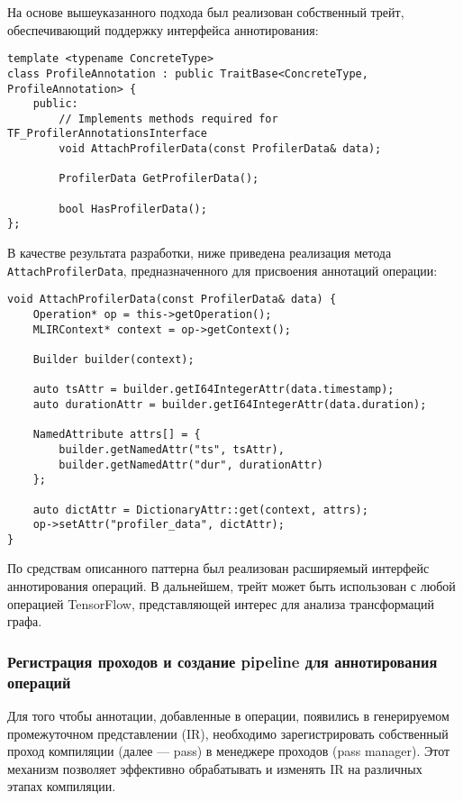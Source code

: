 На основе вышеуказанного подхода был реализован собственный трейт, обеспечивающий поддержку интерфейса аннотирования:

\begin{lstlisting}[caption={Трейт аннотирования операций MLIR}]
template <typename ConcreteType>
class ProfileAnnotation : public TraitBase<ConcreteType, ProfileAnnotation> {
    public:
        // Implements methods required for TF_ProfilerAnnotationsInterface
        void AttachProfilerData(const ProfilerData& data);

        ProfilerData GetProfilerData();

        bool HasProfilerData();
};
\end{lstlisting}

В качестве результата разработки, ниже приведена реализация метода \texttt{AttachProfilerData}, предназначенного для присвоения аннотаций операции:

\begin{lstlisting}[caption={Реализация метода AttachProfilerData}]
void AttachProfilerData(const ProfilerData& data) {
    Operation* op = this->getOperation();
    MLIRContext* context = op->getContext();

    Builder builder(context);

    auto tsAttr = builder.getI64IntegerAttr(data.timestamp);
    auto durationAttr = builder.getI64IntegerAttr(data.duration);

    NamedAttribute attrs[] = {
        builder.getNamedAttr("ts", tsAttr),
        builder.getNamedAttr("dur", durationAttr)
    };

    auto dictAttr = DictionaryAttr::get(context, attrs);
    op->setAttr("profiler_data", dictAttr);
}
\end{lstlisting}

По средствам описанного паттерна был реализован расширяемый интерфейс аннотирования операций.
В дальнейшем, трейт может быть использован с любой операцией TensorFlow, представляющей интерес для анализа трансформаций графа.

\subsubsection{Регистрация проходов и создание pipeline для аннотирования операций}

Для того чтобы аннотации, добавленные в операции, появились в генерируемом промежуточном представлении (IR), необходимо зарегистрировать собственный проход компиляции (далее — pass) в менеджере проходов (pass manager).
Этот механизм позволяет эффективно обрабатывать и изменять IR на различных этапах компиляции.

